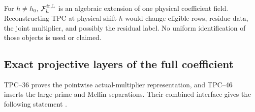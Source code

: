 \begin{remark}
\label{rem:tpc47-no-local-provenance}
For \(h\ne h_0\), \(\mathcal F_h^{\rm fr,L}\) is an algebraic extension of
one physical coefficient field.  Reconstructing TPC at physical shift
\(h\) would change eligible rows, residue data, the joint multiplier,
and possibly the residual label.  No uniform identification of those
objects is used or claimed.
\end{remark}

\subsection{Exact projective layers of the full coefficient}

TPC--36 proves the pointwise actual-multiplier representation, and
TPC--46 inserts the large-prime and Mellin separations.  Their combined
interface gives the following statement
\citep{WangTPC36,WangTPC46}.

